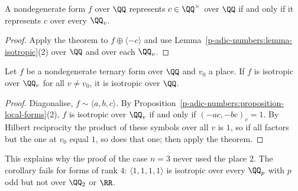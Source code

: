 \begin{corollary}\label{p-adic-numbers:corollary-hasse-minkowski-represent}
A nondegenerate form $f$ over $\QQ$ represents $c \in \QQ^\times$ over $\QQ$ if and only if it represents $c$ over every $\QQ_v$.
\end{corollary}

\begin{proof}
Apply the theorem to $f \oplus \langle -c\rangle$ and use Lemma~\ref{p-adic-numbers:lemma-isotropic}(2) over $\QQ$ and over each $\QQ_v$.
\end{proof}

\begin{corollary}\label{p-adic-numbers:corollary-one-place-redundant}
Let $f$ be a nondegenerate ternary form over $\QQ$ and $v_0$ a place. If $f$ is isotropic over $\QQ_v$ for all $v \neq v_0$, it is isotropic over $\QQ$.
\end{corollary}

\begin{proof}
Diagonalise, $f \sim \langle a, b, c\rangle$. By Proposition~\ref{p-adic-numbers:proposition-local-forms}(2), $f$ is isotropic over $\QQ_v$ if and only if $(-ac, -bc)_v = 1$. By Hilbert reciprocity the product of these
symbols over all $v$ is $1$, so if all factors but the one at $v_0$ equal $1$, so does that one; then apply the theorem.
\end{proof}

This explains why the proof of the case $n = 3$ never used the place $2$. The corollary fails for forms of rank $4$: $\langle 1, 1, 1, 1\rangle$ is isotropic over every $\QQ_p$ with $p$ odd but not over $\QQ_2$ or $\RR$.

